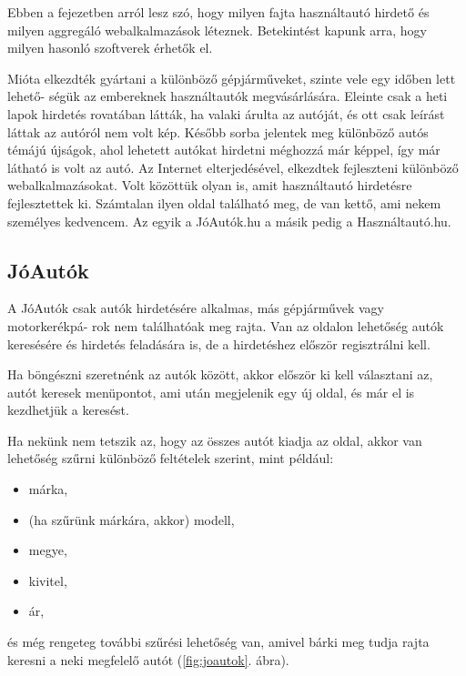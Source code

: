 
Ebben a fejezetben arról lesz szó, hogy milyen fajta használtautó hirdető és milyen aggregáló webalkalmazások léteznek. Betekintést kapunk arra, hogy milyen hasonló szoftverek érhetők el.


Mióta elkezdték gyártani a különböző gépjárműveket, szinte vele egy időben lett lehető-
ségük az embereknek használtautók megvásárlására. Eleinte csak a heti lapok hirdetés rovatában látták, ha valaki árulta az autóját, és ott csak leírást láttak az autóról nem volt kép. Később sorba jelentek meg különböző autós témájú újságok, ahol lehetett autókat hirdetni méghozzá már képpel, így már látható is volt az autó. 
Az Internet elterjedésével, elkezdtek fejleszteni különböző webalkalmazásokat. Volt közöttük olyan is, amit használtautó hirdetésre fejlesztettek ki. Számtalan ilyen oldal található meg, de van kettő, ami nekem személyes kedvencem. Az egyik a JóAutók.hu a másik pedig a Használtautó.hu.

\subsection{JóAutók}
A JóAutók \cite{JoAuto} csak autók hirdetésére alkalmas, más gépjárművek vagy motorkerékpá-
rok nem találhatóak meg rajta. Van az oldalon lehetőség autók keresésére és hirdetés feladására is, de a hirdetéshez először regisztrálni kell.

Ha böngészni szeretnénk az autók között, akkor először ki kell választani az, autót keresek menüpontot, ami után megjelenik egy új oldal, és már el is kezdhetjük a keresést.

Ha nekünk nem tetszik az, hogy az összes autót kiadja az oldal, akkor van lehetőség szűrni különböző feltételek szerint, mint például:
\begin{itemize}
\item márka,
\item (ha szűrünk márkára, akkor) modell,
\item megye,
\item kivitel,
\item ár,
\end{itemize}és még rengeteg további szűrési lehetőség van, amivel bárki meg tudja rajta keresni a neki megfelelő autót (\ref{fig:joautok}. ábra).


